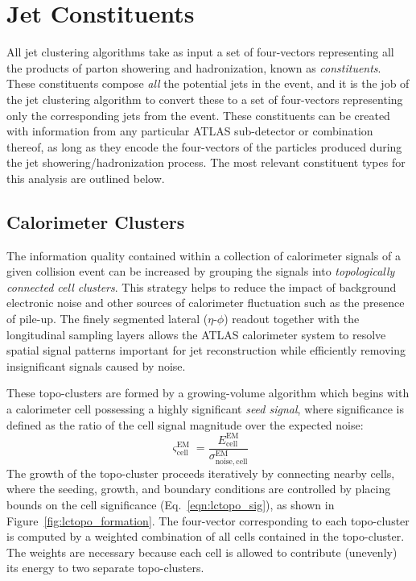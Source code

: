 \section{Jet Constituents}

All jet clustering algorithms take as input a set of four-vectors representing all the products of parton showering and hadronization, known as \textit{constituents}.
These constituents compose \textit{all} the potential jets in the event, and it is the job of the jet clustering algorithm to convert these to a set of four-vectors representing only the corresponding jets from the event.
These constituents can be created with information from any particular ATLAS sub-detector or combination thereof, as long as they encode the four-vectors of the particles produced during the jet showering/hadronization process.
The most relevant constituent types for this analysis are outlined below.

\subsection{Calorimeter Clusters}
The information quality contained within a collection of calorimeter signals of a given collision event can be increased by grouping the signals into \textit{topologically connected cell clusters}.
This strategy helps to reduce the impact of background electronic noise and other sources of calorimeter fluctuation such as the presence of pile-up.
The finely segmented lateral ($\eta$-$\phi$) readout together with the longitudinal sampling layers allows the ATLAS calorimeter system to resolve spatial signal patterns important for jet reconstruction while efficiently removing insignificant signals caused by noise.

\newcommand{\LCTopoSig}{\ensuremath{\varsigma^{\mathrm{EM}}_{\mathrm{cell}}}}
These topo-clusters are formed by a growing-volume algorithm \cite{Aad:2016upy} which begins with a calorimeter cell possessing a highly significant \textit{seed signal}, where significance is defined as the ratio of the cell signal magnitude over the expected noise:
\begin{equation}
    \LCTopoSig = \frac{E^{\mathrm{EM}}_{\mathrm{cell}}}{\sigma^{\mathrm{EM}}_{\mathrm{noise,cell}}}
    \label{eqn:lctopo_sig}
\end{equation}
The growth of the topo-cluster proceeds iteratively by connecting nearby cells, where the seeding, growth, and boundary conditions are controlled by placing bounds on the cell significance (Eq.~\ref{eqn:lctopo_sig}), as shown in Figure~\ref{fig:lctopo_formation}.
The four-vector corresponding to each topo-cluster is computed by a weighted combination of all cells contained in the topo-cluster.
The weights are necessary because each cell is allowed to contribute (unevenly) its energy to two separate topo-clusters.

